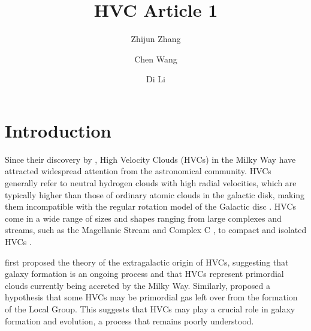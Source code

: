 \documentclass[twocolumn,trackchanges]{aastex701}
\begin{document}
\title{HVC Article 1}

\author[orcid=0009-0000-6711-0472]{Zhijun Zhang}

\author[0000-0001-8923-7757]{Chen Wang}

\author[0000-0003-3010-7661]{Di Li}

\begin{abstract}

\end{abstract}


\section{Introduction}

Since their discovery by \citet{1963CRAS..257.1661M}, High Velocity Clouds (HVCs) in the Milky Way have attracted widespread attention from the astronomical community. HVCs generally refer to neutral hydrogen clouds with high radial velocities, which are typically higher than those of ordinary atomic clouds in the galactic disk, making them incompatible with the regular rotation model of the Galactic disc \citep{1991A&A...250..499W}. HVCs come in a wide range of sizes and shapes ranging from large complexes and streams, such as the Magellanic Stream \citep{1974ApJ...190..291M} and Complex C \citep{1968BAN....20...33H}, to compact and isolated HVCs \citep{1999A&A...341..437B}.

\citet{1966BAN....18..421O} first proposed the theory of the extragalactic origin of HVCs, suggesting that galaxy formation is an ongoing process and that HVCs represent primordial clouds currently being accreted by the Milky Way. Similarly, \citet{1999ApJ...514..818B} proposed a hypothesis that some HVCs may be primordial gas left over from the formation of the Local Group. This suggests that HVCs may play a crucial role in galaxy formation and evolution, a process that remains poorly understood.
\end{document}
